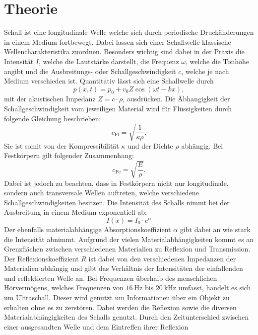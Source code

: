 \section{Theorie}
\label{sec:Theorie}
Schall ist eine longitudinale Welle welche sich durch periodische Druckänderungen in einem Medium fortbewegt. Dabei lassen sich einer Schallwelle klassische Wellencharakteristika
zuordnen. Besonders wichtig sind dabei in der Praxis die Intensität $I$, welche die Lautstärke darstellt, die Frequenz $\omega$, welche die Tonhöhe angibt und die Ausbreitungs- oder
Schallgeschwindigkeit $c$, welche je nach Medium verschieden ist. Quantitativ lässt sich eine Schallwelle durch
\begin{equation}
  p(x,t) = p_0 + v_0 Z \cos(\omega t - k x),
\end{equation}
mit der akustischen Impedanz $Z=c\cdot\rho$, ausdrücken. Die Äbhangigkeit der Schallgeschwindigkeit vom jeweiligen Material wird für Flüssigkeiten durch folgende Gleichung beschrieben:
\begin{equation}
  c_\text{Fl} = \sqrt{\frac{1}{\kappa \rho}}.
\end{equation}
Sie ist somit von der Kompressibilität $\kappa$ und der Dichte $\rho$ abhängig.
Bei Festkörpern gilt folgender Zusammenhang:
\begin{equation}
  c_\text{Fe} = \sqrt{\frac{E}{\rho}}.
\end{equation}
Dabei ist jedoch zu beachten, dass in Festkörpern nicht nur longitudinale, sondern auch transversale Wellen auftreten, welche verschiedene Schallgeschwindigkeiten besitzen.
Die Intensität des Schalls nimmt bei der Ausbreitung in einem Medium exponentiell ab:
\begin{equation}
  I(x)= I_0 \cdot e^{\alpha}
\end{equation}
Der ebenfalls materialabhängige Absorptionskoeffizient $\alpha$ gibt dabei an wie stark die Intensität abnimmt.
Aufgrund der vielen Materialabhängigkeiten kommt es an Grenzflächen zwischen verschiedenen Materialien zu Reflexion und Transmission.
Der Reflexionskoeffizient $R$ ist dabei von den verschiedenen Impedanzen der Materialien abhängig und gibt das Verhältnis der Intensitäten der einfallenden und reflektierten Welle an.
Bei Frequenzen überhalb des menschlichen Hörvermögens, welches Frequenzen von $\SI{16}{\hertz}$ bis
$\SI{20}{\kilo\hertz}$ umfasst, handelt es sich um Ultraschall. Dieser wird genutzt um Informationen über ein Objekt zu erhalten ohne es zu zerstören.
Dabei werden die Reflexion sowie die diversen Materialabhängigkeiten des Schalls genutzt. Durch den Zeitunterschied zwischen einer ausgesandten Welle und dem Eintreffen ihrer Reflexion
